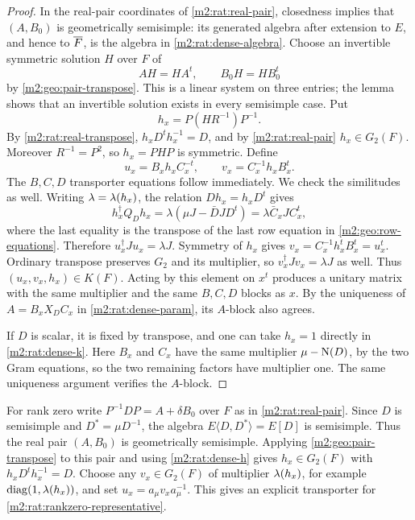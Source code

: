 \begin{proof}
In the real-pair coordinates of \cref{m2:rat:real-pair},
closedness implies that
$(A,B_0)$ is geometrically semisimple: its generated
algebra after extension to $E$, and hence to $\overline F$,
is the algebra in \eqref{m2:rat:dense-algebra}.
Choose an invertible symmetric solution $H$ over $F$
of
\[
 AH=HA^t,\qquad B_0H=HB_0^t
\]
by \cref{m2:geo:pair-transpose}.  This is a linear system
on three entries; the lemma shows that an invertible
solution exists in every semisimple case.  Put
\begin{equation}\label{m2:rat:dense-h}
 h_x=P(HR^{-1})P^{-1}.
\end{equation}
By \eqref{m2:rat:real-transpose},
$h_xD^th_x^{-1}=D$, and by
\cref{m2:rat:real-pair} $h_x\in G_2(F)$.
Moreover $R^{-1}=P^2$, so $h_x=PHP$ is symmetric.
Define
\begin{equation}\label{m2:rat:dense-k}
 u_x=B_xh_xC_x^{-t},\qquad
 v_x=C_x^{-1}h_xB_x^t.
\end{equation}
The $B,C,D$ transporter equations follow immediately.
We check the similitudes as well.  Writing
$\lambda=\lambda(h_x)$, the relation
$Dh_x=h_xD^t$ gives
\[
 h_x^\dagger Q_Dh_x
 =\lambda(\mu J-\bar D J D^t)
 =\lambda\bar C_x J C_x^t,
\]
where the last equality is the transpose of the last
row equation in \eqref{m2:geo:row-equations}.  Therefore
$u_x^\dagger Ju_x=\lambda J$.
Symmetry of $h_x$ gives
$v_x=C_x^{-1}h_x^tB_x^t=u_x^t$.
Ordinary transpose preserves $G_2$ and its multiplier,
so $v_x^\dagger Jv_x=\lambda J$ as well.
Thus $(u_x,v_x,h_x)\in K(F)$.
Acting by this element on $x^t$ produces a unitary
matrix with the same multiplier and the same $B,C,D$
blocks as $x$.  By the uniqueness of $A=B_xX_DC_x$
in \cref{m2:rat:dense-param}, its $A$-block also agrees.

If $D$ is scalar, it is fixed by transpose, and one
can take $h_x=1$ directly in \eqref{m2:rat:dense-k}.
Here $B_x$ and $C_x$ have the same multiplier
$\mu-\operatorname{N}(D)$, by the two Gram equations, so the two
remaining factors have multiplier one.  The same
uniqueness argument verifies the $A$-block.
\end{proof}

For rank zero write $P^{-1}DP=A+\delta B_0$ over $F$
as in \cref{m2:rat:real-pair}.  Since $D$ is semisimple
and $D^*=\mu D^{-1}$, the algebra
$E\langle D,D^*\rangle=E[D]$ is semisimple.
Thus the real pair $(A,B_0)$ is geometrically semisimple.
Applying \cref{m2:geo:pair-transpose} to this pair and
using \eqref{m2:rat:dense-h} gives $h_x\in G_2(F)$ with
$h_xD^th_x^{-1}=D$.  Choose any $v_x\in G_2(F)$
of multiplier $\lambda(h_x)$, for example
$\operatorname{diag}(1,\lambda(h_x))$, and set
$u_x=a_\mu v_xa_\mu^{-1}$.  This gives an explicit
transporter for \eqref{m2:rat:rankzero-representative}.

